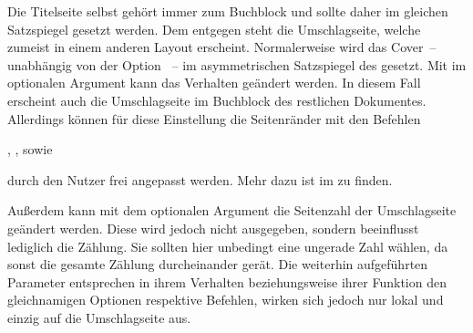 \begin{Declaration*}{}
\begin{Declaration*}{}
\begin{Declaration*}{}
\begin{Declaration}
\begin{Declaration}[v2.02]{%
}
\begin{Declaration}{}
\begin{Declaration}[v2.02]{}
\begin{Declaration}[v2.03]{}
\begin{Declaration}[v2.03]{}
\begin{Declaration}[v2.03]{%
}
\begin{Declaration}[v2.03]{%
}
\begin{Declaration}[v2.03]{}
\begin{Declaration}[v2.03]{}
\begin{Declaration}[v2.03]{}
Die Titelseite selbst gehört immer zum Buchblock und sollte daher im gleichen 
Satzspiegel gesetzt werden. Dem entgegen steht die Umschlagseite, welche 
zumeist in einem anderen Layout erscheint. Normalerweise wird das Cover~-- 
unabhängig von der Option ~-- im asymmetrischen Satzspiegel 
des \CDs gesetzt. Mit  im optionalen 
Argument kann das Verhalten geändert werden. In diesem Fall erscheint auch die 
Umschlagseite im Buchblock des restlichen Dokumentes. Allerdings können für 
diese Einstellung die Seitenränder mit den Befehlen 
\begin{Bundle}{}
, , 
 sowie   
\end{Bundle}
durch den Nutzer frei angepasst werden. Mehr dazu ist im \scrguide zu finden.

Außerdem kann mit dem optionalen Argument die Seitenzahl der Umschlagseite 
geändert werden. Diese wird jedoch nicht ausgegeben, sondern beeinflusst 
lediglich die Zählung. Sie sollten hier unbedingt eine ungerade Zahl wählen, da 
sonst die gesamte Zählung durcheinander gerät. Die weiterhin aufgeführten 
Parameter entsprechen in ihrem Verhalten beziehungsweise ihrer Funktion den 
gleichnamigen Optionen respektive Befehlen, wirken sich jedoch nur lokal und 
einzig auf die Umschlagseite aus.
%
\end{Declaration}
\end{Declaration}
\end{Declaration}
\end{Declaration}
\end{Declaration}
\end{Declaration}
\end{Declaration}
\end{Declaration}
\end{Declaration}
\end{Declaration}
\end{Declaration}


\end{Declaration*}
\end{Declaration*}
\end{Declaration*}
